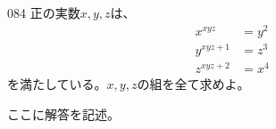 \begin{thm}{084}{\maru}{}
 正の実数$x, y, z$は、
 \begin{align*}
  x^{xyz}&=y^2 \\
  y^{xyz+1}&=z^3 \\
  z^{xyz+2}&=x^4
 \end{align*}
 を満たしている。$x, y, z$の組を全て求めよ。
\end{thm}

ここに解答を記述。